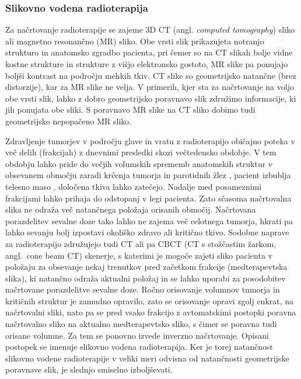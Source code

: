 \documentclass[a4paper,twoside,11pt]{article}
\begin{document}
	\subsubsection*{Slikovno vodena radioterapija}
	\par{
	  Za načrtovanje radioterapije se zajeme 3D CT (angl. \emph{computed tomography}) sliko ali magnetno resonančno (MR) sliko. Obe vrsti slik prikazujeta notranjo strukturo in anatomsko zgradbo pacienta, pri čemer so na CT slikah bolje vidne kostne strukture in strukture z višjo elektronsko gostoto, MR slike pa ponujajo boljši kontrast na področju mehkih tkiv. CT slike so geometrijsko natančne (brez distorzije), kar za MR slike ne velja. V primerih, kjer sta za načrtovanje na voljo obe vrsti slik, lahko z dobro geometrijsko poravnavo slik združimo informacije, ki jih ponujata obe sliki. S poravnavo MR slike na CT sliko dobimo tudi geometrijsko nepopačeno MR sliko.
	}
	\par{
	  Zdravljenje tumorjev v področju glave in vratu z radioterapijo običajno poteka v več delih (frakcijah) z dnevnimi presledki skozi večtedensko obdobje. V tem obdobju lahko pride do večjih volumskih sprememb anatomskih struktur v obsevanem območju zaradi krčenja tumorja \cite{surucu2016} in parotidnih žlez \cite{fiorentino2012}, pacient izbublja telesno maso \cite{ottosson2013}, določena tkiva lahko zatečejo. Nadalje med posameznimi frakcijami lahko prihaja do odstopanj v legi pacienta. Zato sčasoma načrtovalna slika ne odraža več natančnega položaja orisanih območij. Načrtovana porazdelitev sevalne doze tako lahko ne zajema več celotnega tumorja, hkrati pa lahko sevanju bolj izpostavi okoliško zdravo ali kritično tkivo. Sodobne naprave za radioterapijo združujejo tudi CT ali pa CBCT (CT s stožčastim žarkom, angl.~cone beam CT) skenerje, s katerimi je mogoče zajeti sliko pacienta v položaju za obsevanje nekaj trenutkov pred začetkom frakcije (medterapevtska slika), ki natančno odraža aktualni položaj in se lahko uporabi za posodobitev načrtovane porazdelitve sevalne doze. Ročno orisovanje volumnov tumorja in kritičnih struktur je zamudno opravilo, zato se orisovanje opravi zgolj enkrat, na načrtovalni sliki, nato pa se pred vsako frakcijo z avtomatskimi postopki poravna načrtovalno sliko na aktualno medterapevtsko sliko, s čimer se poravna tudi orisane volumne. Za tem se ponovno izvede inverzno načrtovanje. Opisani postopek se imenuje slikovno vodena radioterapija. Ker je torej natančnost slikovno vodene radioterapije v veliki meri odvisna od natančnosti geometrijske poravnave slik, je slednjo smiselno izboljševati.
	}
\end{document}
